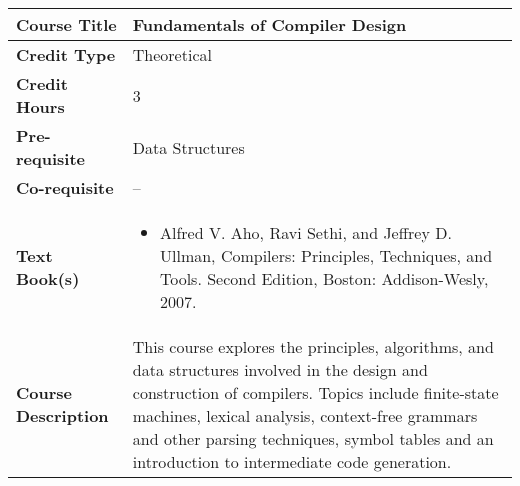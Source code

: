 \documentclass[11pt]{article}
\begin{document}
\begin{table}[h!]
\begin{tabular}{|l|l|}
\hline
\textbf{Course Title}       &  Fundamentals of Compiler Design \\ \hline
\textbf{Credit Type}        &   Theoretical \\ \hline
\textbf{Credit Hours}       &  3 \\ \hline
\textbf{Pre-requisite}       & Data Structures \\ \hline
\textbf{Co-requisite}       & -- \\ \hline
\textbf{Text Book(s)}       & \begin{minipage}{.70\textwidth}
\begin{itemize} \itemsep-0.4em
	\vspace{3mm}
	\item Alfred V. Aho, Ravi Sethi, and Jeffrey D. Ullman, Compilers: Principles, Techniques, and Tools. Second Edition, Boston: Addison-Wesly, 2007.
	\vspace{3mm}
\end{itemize}
\end{minipage}\\ \hline
\textbf{Course Description} & \begin{minipage}{.70\textwidth}
\vspace{3mm}
This course explores the principles, algorithms, and data structures involved in the design and
construction of compilers. Topics include finite-state machines, lexical analysis, context-free
grammars and other parsing techniques, symbol tables and an introduction to intermediate code
generation.
\vspace{3mm}
\end{minipage} \\ \hline
\end{tabular}
\end{table}
\end{document}
